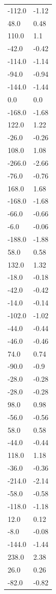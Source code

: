 \begin{longtable}{ll}
-112.0 & -1.12 \\
48.0 & 0.48 \\
110.0 & 1.1 \\
-42.0 & -0.42 \\
-114.0 & -1.14 \\
-94.0 & -0.94 \\
-144.0 & -1.44 \\
0.0 & 0.0 \\
-168.0 & -1.68 \\
122.0 & 1.22 \\
-26.0 & -0.26 \\
108.0 & 1.08 \\
-266.0 & -2.66 \\
-76.0 & -0.76 \\
168.0 & 1.68 \\
-168.0 & -1.68 \\
-66.0 & -0.66 \\
-6.0 & -0.06 \\
-188.0 & -1.88 \\
58.0 & 0.58 \\
132.0 & 1.32 \\
-18.0 & -0.18 \\
-42.0 & -0.42 \\
-14.0 & -0.14 \\
-102.0 & -1.02 \\
-44.0 & -0.44 \\
-46.0 & -0.46 \\
74.0 & 0.74 \\
-90.0 & -0.9 \\
-28.0 & -0.28 \\
-28.0 & -0.28 \\
98.0 & 0.98 \\
-56.0 & -0.56 \\
58.0 & 0.58 \\
-44.0 & -0.44 \\
118.0 & 1.18 \\
-36.0 & -0.36 \\
-214.0 & -2.14 \\
-58.0 & -0.58 \\
-118.0 & -1.18 \\
12.0 & 0.12 \\
-8.0 & -0.08 \\
-144.0 & -1.44 \\
238.0 & 2.38 \\
26.0 & 0.26 \\
-82.0 & -0.82 \\

\end{longtable}
